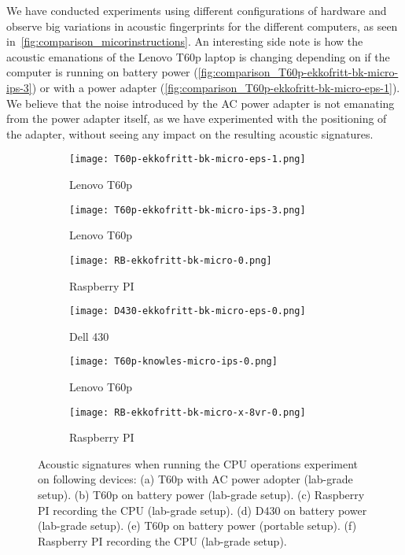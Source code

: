 We have conducted experiments using different configurations of hardware and observe big variations in acoustic fingerprints for the different computers, as seen in~\autoref{fig:comparison_micorinstructions}.
An interesting side note is how the acoustic emanations of the Lenovo T60p laptop is changing depending on if the computer is running on battery power (\autoref{fig:comparison_T60p-ekkofritt-bk-micro-ips-3}) or with a power adapter (\autoref{fig:comparison_T60p-ekkofritt-bk-micro-eps-1}).
We believe that the noise introduced by the AC power adapter is not emanating from the power adapter itself, as we have experimented with the positioning of the adapter, without seeing any impact on the resulting acoustic signatures.

\begin{figure}[ht]
    \centering
    \begin{subfigure}{0.32\textwidth}
        \centering
        \texttt{[image: T60p-ekkofritt-bk-micro-eps-1.png]}
        \caption{Lenovo T60p}
        \label{fig:comparison_T60p-ekkofritt-bk-micro-eps-1}
    \end{subfigure}
    \begin{subfigure}{0.32\textwidth}
        \centering
        \texttt{[image: T60p-ekkofritt-bk-micro-ips-3.png]}
        \caption{Lenovo T60p}
        \label{fig:comparison_T60p-ekkofritt-bk-micro-ips-3}
    \end{subfigure}
    \begin{subfigure}{0.32\textwidth}
        \centering
        \texttt{[image: RB-ekkofritt-bk-micro-0.png]}
        \caption{Raspberry PI}
        \label{fig:comparison_RB-ekkofritt-bk-micro-0}
    \end{subfigure}
    \begin{subfigure}{0.32\textwidth}
        \centering
        \texttt{[image: D430-ekkofritt-bk-micro-eps-0.png]}
        \caption{Dell 430}
        \label{fig:comparison_D430-ekkofritt-bk-micro-eps-0}
    \end{subfigure}
    \begin{subfigure}{0.32\textwidth}
        \centering
        \texttt{[image: T60p-knowles-micro-ips-0.png]}
        \caption{Lenovo T60p}
        \label{fig:comparison_T60p-knowles-micro-ips-0}
    \end{subfigure}
    \begin{subfigure}{0.32\textwidth}
        \centering
        \texttt{[image: RB-ekkofritt-bk-micro-x-8vr-0.png]}
        \caption{Raspberry PI}
        \label{fig:comparison_RB-ekkofritt-bk-micro-x-8vr-0}
    \end{subfigure}
    \caption{ Acoustic signatures when running the CPU operations experiment on following devices:
    (a) T60p with AC power adopter (lab-grade setup).
    (b) T60p on battery power (lab-grade setup).
    (c) Raspberry PI recording the CPU (lab-grade setup).
    (d) D430 on battery power (lab-grade setup).
    (e) T60p on battery power (portable setup).
    (f) Raspberry PI recording the CPU (lab-grade setup).}
    \label{fig:comparison_micorinstructions}
\end{figure}

